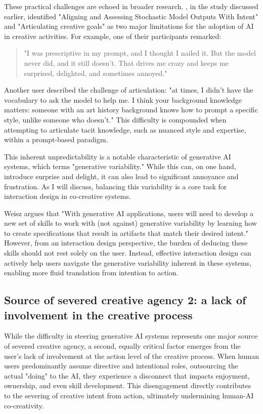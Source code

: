 These practical challenges are echoed in broader research. \cite{Palani2024-on}, in the study discussed earlier, identified "Aligning and Assessing Stochastic Model Outputs With Intent" and "Articulating creative goals" as two major limitations for the adoption of AI in creative activities. For example, one of their participants remarked:
\begin{quote}
"I was prescriptive in my prompt, and I thought I nailed it. But the model never did, and it still doesn’t. That drives me crazy and keeps me surprised, delighted, and sometimes annoyed."
\end{quote}
Another user described the challenge of articulation: "at times, I didn’t have the vocabulary to ask the model to help me. I think your background knowledge matters: someone with an art history background knows how to prompt a specific style, unlike someone who doesn’t." This difficulty is compounded when attempting to articulate tacit knowledge, such as nuanced style and expertise, within a prompt-based paradigm.

This inherent unpredictability is a notable characteristic of generative AI systems, which \cite{Weisz2024-io} terms "generative variability." While this can, on one hand, introduce surprise and delight, it can also lead to significant annoyance and frustration. As I will discuss, balancing this variability is a core task for interaction design in co-creative systems.

Weisz argues that "With generative AI applications, users will need to develop a new set of skills to work with (not against) generative variability by learning how to create specifications that result in artifacts that match their desired intent." However, from an interaction design perspective, the burden of deducing these skills should not rest solely on the user. Instead, effective interaction design can actively help users navigate the generative variability inherent in these systems, enabling more fluid translation from intention to action.

\subsection{Source of severed creative agency 2: a lack of involvement in the creative process}

While the difficulty in steering generative AI systems represents one major source of severed creative agency, a second, equally critical factor emerges from the user's lack of involvement at the action level of the creative process. When human users predominantly assume directive and intentional roles, outsourcing the actual "doing" to the AI, they experience a disconnect that impacts enjoyment, ownership, and even skill development. This disengagement directly contributes to the severing of creative intent from action, ultimately undermining human-AI co-creativity.

